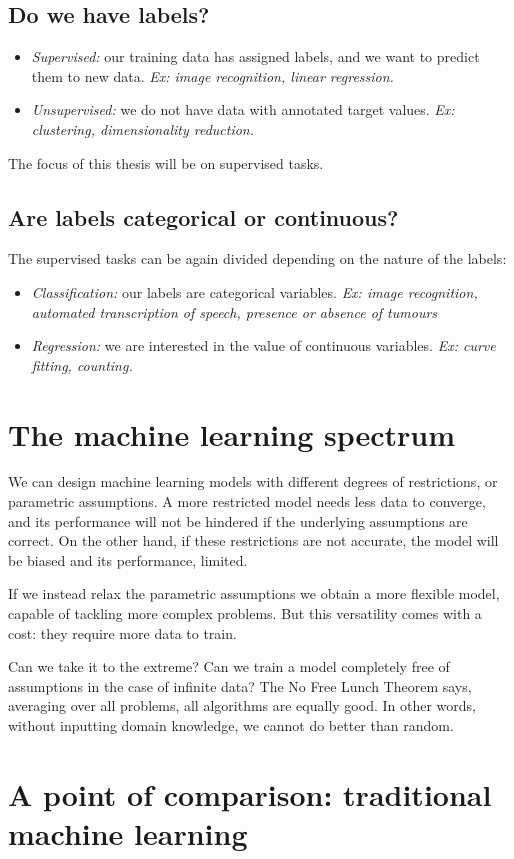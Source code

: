 \subsection{Do we have labels?}
\begin{itemize}
\item \emph{Supervised:} our training data has assigned labels, and we want to predict them to new data. \emph{Ex: image recognition, linear regression.}
\item \emph{Unsupervised:} we do not have data with annotated target values. \emph{Ex: clustering, dimensionality reduction.}
\end{itemize}

The focus of this thesis will be on supervised tasks.

\subsection{Are labels categorical or continuous?}
The supervised tasks can be again divided depending on the nature of the labels:
\begin{itemize}
\item \emph{Classification:} our labels are categorical variables. \emph{Ex: image recognition, automated transcription of speech, presence or absence of tumours}
\item \emph{Regression:} we are interested in the value of continuous variables. \emph{Ex: curve fitting, counting.}
\end{itemize}


\section{The machine learning spectrum}
We can design machine learning models with different degrees of restrictions, or parametric assumptions.
A more restricted model needs less data to converge, and its performance will not be hindered if the underlying assumptions are correct.
On the other hand, if these restrictions are not accurate, the model will be biased and its performance, limited.

If we instead relax the parametric assumptions we obtain a more flexible model, capable of tackling more complex problems.
But this versatility comes with a cost: they require more data to train.


Can we take it to the extreme?
Can we train a model completely free  of assumptions in the case of infinite data? The No Free Lunch Theorem \citep{no_free_lunch} says, averaging over all problems, all algorithms are equally good.
In other words, without inputting domain knowledge, we cannot do better than random.

\section{A point of comparison: traditional machine learning}


